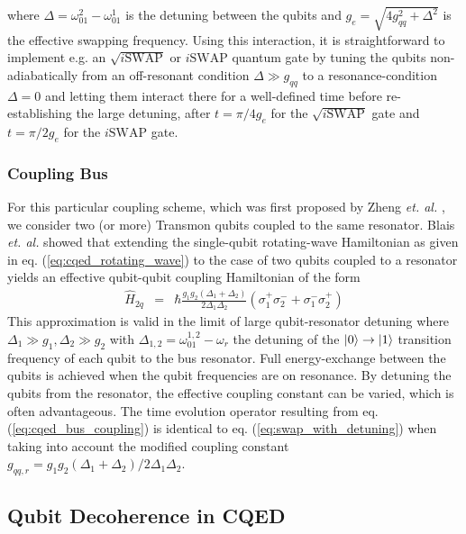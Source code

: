 %
where $\Delta = \omega_{01}^2-\omega_{01}^1$ is the detuning between the qubits and $g_e = \sqrt{4g_{qq}^2+\Delta^2}$ is the effective swapping frequency. Using this interaction, it is straightforward to implement e.g. an $\sqrt{i\mathrm{SWAP}}$ or $i\mathrm{SWAP}$ quantum gate by tuning the qubits non-adiabatically from an off-resonant condition $\Delta \gg g_{qq}$ to a resonance-condition $\Delta = 0$ and letting them interact there for a well-defined time before re-establishing the large detuning, after $t=\pi/4g_e$ for the $\sqrt{i\mathrm{SWAP}}$ gate and $t=\pi/2g_e$ for the $i\mathrm{SWAP}$ gate.

\subsubsection{Coupling Bus}

For this particular coupling scheme, which was first proposed by Zheng {\it et. al.} \citep{zheng_efficient_2000,zheng_one-step_2001,osnaghi_coherent_2001}, we consider two (or more) Transmon qubits coupled to the same resonator. Blais {\it et. al.} \citep{blais_quantum-information_2007} showed that extending the single-qubit rotating-wave Hamiltonian as given in eq. (\ref{eq:cqed_rotating_wave}) to the case of two qubits coupled to a resonator yields an effective qubit-qubit coupling Hamiltonian of the form
%
\begin{eqnarray}
\hat{H}_{2q} & = & \hbar\frac{g_1 g_2(\Delta_1+\Delta_2)}{2\Delta_1\Delta_2}(\sigma_1^+\sigma_2^-+\sigma_1^-\sigma_2^+) \label{eq:cqed_bus_coupling}
\end{eqnarray}
%
This approximation is valid in the limit of large qubit-resonator detuning where $\Delta_1 \gg g_1,\Delta_2 \gg g_2$ with $\Delta_{1,2} = \omega_{01}^{1,2}-\omega_r$ the detuning of the $\left| 0 \right>\to\left| 1 \right>$ transition frequency of each qubit to the bus resonator. Full energy-exchange between the qubits is achieved when the qubit frequencies are on resonance. By detuning the qubits from the resonator, the effective coupling constant can be varied, which is often advantageous. The time evolution operator resulting from eq. (\ref{eq:cqed_bus_coupling}) is identical to eq. (\ref{eq:swap_with_detuning}) when taking into account the modified coupling constant $g_{qq,r}=g_1 g_2(\Delta_1+\Delta_2)/2\Delta_1\Delta_2$.

\subsection{Qubit Decoherence in CQED} \label{section:decoherence_in_cqed}

